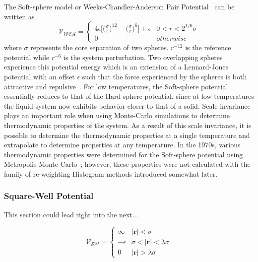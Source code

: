 \documentclass[letterpaper,twocolumn,amsmath,amssymb,pre,aps,10pt]{revtex4-1}
\begin{document}
The Soft-sphere model or Weeks-Chandler-Anderson Pair 
Potential~\cite{andersen1971relationship, weeks1971role} can be written 
as \begin{equation}
	\mathcal{V}_{\mathcal{WCA}}=\begin{cases}4\epsilon 
	\bigg[\bigg(\frac{\sigma}{r}\bigg)^{12}-\bigg(\frac{\sigma}{r}\bigg)^{6}\bigg]+\epsilon 
	& 0 < r<2^{1/6}\sigma\\0 & otherwise\end{cases} 
\end{equation} where $\sigma$ represents the core separation of two 
spheres.  $r^{-12}$ is the reference potential while $r^{-6}$ is the 
system perturbation.  Two overlapping spheres experience this potential 
energy which is an extension of a Lennard-Jones potential with an 
offset $\epsilon$ such that the force experienced by the spheres is 
both attractive and repulsive~\cite{hoover1970soft}. For low 
temperatures, the Soft-sphere potential essentially reduces to that of 
the Hard-sphere potential, since at low temperatures the liquid system 
now exhibits behavior closer to that of a solid. Scale invariance plays 
an important role when using Monte-Carlo simulations to determine 
thermodynamic properties of the system. As a result of this scale 
invariance, it is possible to determine the thermodynamic properties at 
a single temperature and extrapolate to determine properties at any 
temperature.  In the 1970s, various thermodynamic properties were 
determined for the Soft-sphere potential using Metropolis 
Monte-Carlo~\cite{andersen1971relationship, hansen1970phase}; however, 
these properties were not calculated with the family of re-weighting 
Histogram methods introduced somewhat later.

\subsubsection{Square-Well Potential}

This section could lead right into the next...

\begin{equation}
 \mathcal{V}_{\mathcal{SW}}=\begin{cases} \infty & 
 \lvert\textbf{r}\rvert< \sigma\\-\epsilon & 
 \sigma<\lvert\textbf{r}\rvert<\lambda\sigma\\0 & 
 \lvert\textbf{r}\rvert > \lambda\sigma\end{cases}
\end{equation}
\end{document}
